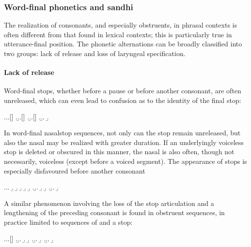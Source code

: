 \subsubsection{Word-final phonetics and sandhi}
\label{sec:word-final-phonetics}

The realization of consonants, and especially obstruents, in phrasal contexts is often different from that found in lexical contexts; this is particularly true in utterance-final position. The phonetic alternations can be broadly classified into two groups: lack of release and loss of laryngeal specification.

\paragraph{Lack of release}
\label{sec:lack-release}

Word-final stops, whether before a pause or before another consonant, are often unreleased, which can even lead to confusion as to the identity of the final stop:

\ex.\a.\a.[]
\z.\b.\a.[]
\z.\b.\a.[]
\z.\b.\a.
\b.


In word-final nasal\endash stop sequences, not only can the stop remain unreleased, but also the nasal may be realized with greater duration. If an underlyingly voiceless stop is deleted or obscured in this manner, the nasal is also often, though not necessarily, voiceless (except before a voiced segment). The appearance of stops is especially disfavoured before another consonant

\ex.\label{bothoa-pont-et-al}\a.\a.
\b.
\b.
\b.
\b.
\b.
\z.\b.\a.
\b.
\b.
\z.\b.\a.
\b.

A similar phenomenon involving the loss of the stop articulation and a lengthening of the preceding consonant is found in obstruent sequences, in practice limited to sequences of \ipa{[s]} and a stop:

\ex.\a.\a.[]
\z.\b.\a.
\b.
\b.
\z.\b.\a.
\b.
\z.\b.\a.
\b.


